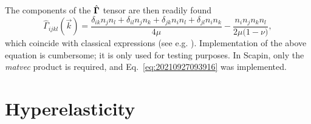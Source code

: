 The components of the \(\hat{\boldsymbol \Gamma}\) tensor are then readily found
\begin{equation}
  \hat{\Gamma}_{ijkl}(\vec k)
  =\frac{\delta_{ik}n_jn_l+\delta_{il}n_jn_k+\delta_{jk}n_in_l+\delta_{jl}n_in_k}{4\mu}
  -\frac{n_in_jn_kn_l}{2\mu\bigl(1-\nu\bigr)},
\end{equation}
which coincide with classical expressions (see
e.g. \textcite{suqu1990}). Implementation of the above equation is cumbersome;
it is only used for testing purposes. In Scapin, only the \emph{matvec} product
is required, and Eq.~\eqref{eq:20210927093916} was implemented.

\section{Hyperelasticity}

